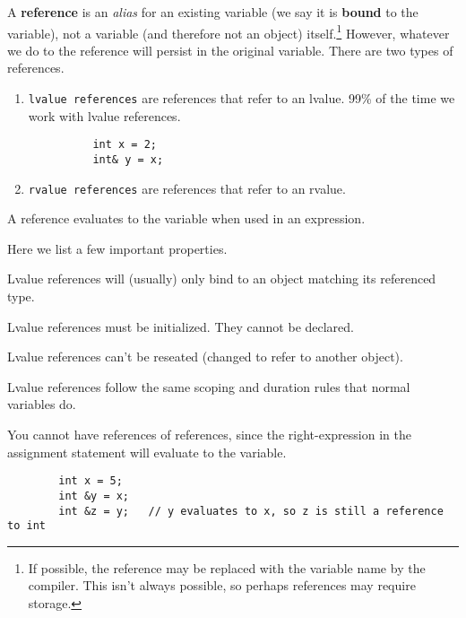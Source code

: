 \documentclass{article}
\begin{document}
    \begin{definition}
      A \textbf{reference} is an \textit{alias} for an existing variable (we say it is \textbf{bound} to the variable), not a variable (and therefore not an object) itself.\footnote{If possible, the reference may be replaced with the variable name by the compiler. This isn't always possible, so perhaps references may require storage.} However, whatever we do to the reference will persist in the original variable. There are two types of references. 
      \begin{enumerate}
        \item \texttt{lvalue references} are references that refer to an lvalue. 99\% of the time we work with lvalue references. 
        \begin{lstlisting}
          int x = 2; 
          int& y = x; 
        \end{lstlisting}

        \item \texttt{rvalue references} are references that refer to an rvalue. 
      \end{enumerate} 
      A reference evaluates to the variable when used in an expression. 
    \end{definition}

    Here we list a few important properties. 

    \begin{lemma}[Typechecking]
      Lvalue references will (usually) only bind to an object matching its referenced type. 
    \end{lemma}

    \begin{lemma}[Initialization]
      Lvalue references must be initialized. They cannot be declared. 
    \end{lemma}

    \begin{lemma}[No Reseating]
      Lvalue references can't be reseated (changed to refer to another object). 
    \end{lemma}

    \begin{lemma}
      Lvalue references follow the same scoping and duration rules that normal variables do. 
    \end{lemma} 

    \begin{lemma}
      You cannot have references of references, since the right-expression in the assignment statement will evaluate to the variable. 
      \begin{lstlisting}
        int x = 5; 
        int &y = x; 
        int &z = y;   // y evaluates to x, so z is still a reference to int
      \end{lstlisting}
    \end{lemma}
\end{document}
